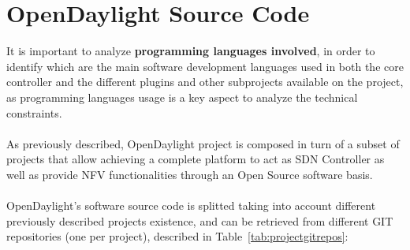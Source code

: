 \documentclass[a4paper, 12pt]{book}
\begin{document}
\section{OpenDaylight Source Code}
\label{chap:odltech_source_code}
It is important to analyze \textbf{programming languages involved}, in order to identify which are the main software development languages used in both the core controller and the different plugins and other subprojects available on the project, as programming languages usage is a key aspect to analyze the technical constraints.\\
\\
As previously described, OpenDaylight project is composed in turn of a subset of projects that allow achieving a complete platform to act as SDN Controller as well as provide NFV functionalities through an Open Source software basis.\\
\\
OpenDaylight's software source code is splitted taking into account different previously described projects existence, and can be retrieved from different GIT repositories (one per project), described in Table~\ref{tab:projectgitrepos}:
\end{document}
